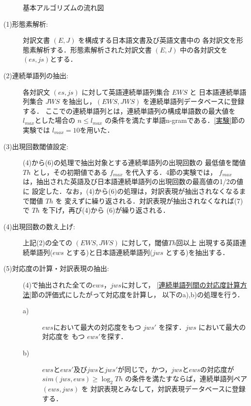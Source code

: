 \begin{figure}[t]
  \begin{center}
    \epsfxsize=9cm 
  \end{center}
  \caption{基本アルゴリズムの流れ図}
  \label{基本アルゴリズム}
\end{figure}

\vspace{5mm}

\begin{description}
\item[(1)形態素解析:] 対訳文書 $(E,J)$ を構成する日本語文書及び英語文書中の
各対訳文を形態素解析する．形態素解析された対訳文書 $(E,J)$ 中の各対訳文を 
$(es,js)$とする．

\item[(2)連続単語列の抽出:] 各対訳文 $(es,js)$ に対して英語連続単語列集合 $EWS$ と
日本語連続単語列集合 $JWS$ を抽出し，$ (EWS,JWS) $ を連続単語列データベースに登録する．
ここでの連続単語列とは，連続単語列の構成単語数の最大値を $l_{max} $とした場合の
$ n \leq l_{max} $ の条件を満たす単語n-gramである．\ref{実験}節の実験では
$ l_{max}=10 $を用いた．

\item[(3)出現回数閾値設定:] (4)から(6)の処理で抽出対象とする連続単語列の出現回数の
最低値を閾値 $ Th $ とし，その初期値である $ f_{max} $ を代入する．4節の実験では，
$ f_{max} $ は，抽出された英語及び日本語連続単語列の出現回数の最高値の1/2の値に
設定した．なお，(4)から(6)の処理は，対訳表現が抽出されなくなるまで閾値 $Th$ を
変えずに繰り返される．対訳表現が抽出されなくなれば(7)で $Th$ を下げ，再び(4)から
(6)が繰り返される．

\item[(4)出現回数の数え上げ:] 上記(2)の全ての $(EWS, JWS)$ に対して，閾値$Th$回以上
出現する英語連続単語列($ews$ とする)と日本語連続単語列($jws$ とする)を抽出する．

\item[(5)対応度の計算・対訳表現の抽出:] (4)で抽出された全ての$ews$，$jws$に対して，
\ref{連続単語列間の対応度計算方法}節の評価式にしたがって対応度を計算し，
以下のa),b)の処理を行う．

\begin{description}
\item[a)] $ews$において最大の対応度をもつ $jws'$ を探す．$jws$ において最大の対応度を
もつ $ews'$を探す．
\item[b)] $ews$と$ews'$及び$jws$と$jws'$が同じで，かつ，$jws$と$ews$の対応度が\\
$ sim(jws,ews)\geq \log_{2}Th $ の条件を満たすならば，連続単語列ペア $(ews,jws)$ を
対訳表現とみなして，対訳表現データベースに登録する．
\end{description}


\end{description}
